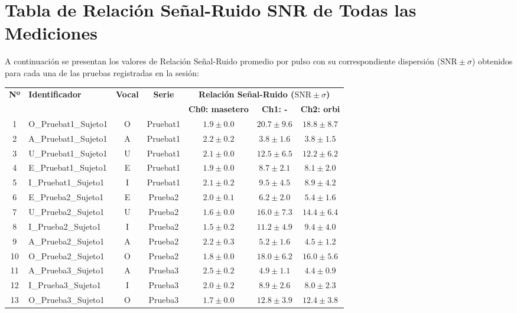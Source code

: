 \documentclass[11pt,a4paper]{article}
\begin{document}
\section{Tabla de Relación Señal-Ruido SNR de Todas las Mediciones}
A continuación se presentan los valores de Relación Señal-Ruido promedio por pulso con su correspondiente dispersión ($\text{SNR} \pm \sigma$) obtenidos para cada una de las pruebas registradas en la sesión:
\begin{table}[H]
\centering
\small
\setlength{\tabcolsep}{4.5pt}
\begin{tabular}{c l c c c c c}
\toprule
\textbf{Nº} & \textbf{Identificador} & \textbf{Vocal} & \textbf{Serie} & \multicolumn{3}{c}{\textbf{Relación Señal-Ruido ($\text{SNR} \pm \sigma$)}} \\
\cmidrule(lr){5-7}
& & & & \textbf{Ch0: masetero} & \textbf{Ch1: -} & \textbf{Ch2: orbi} \\
\midrule
1 & O\_Pruebat1\_Sujeto1 & O & Pruebat1 & $1.9 \pm 0.0$ & $20.7 \pm 9.6$ & $18.8 \pm 8.7$ \\
2 & A\_Pruebat1\_Sujeto1 & A & Pruebat1 & $2.2 \pm 0.2$ & $3.8 \pm 1.6$ & $3.8 \pm 1.5$ \\
3 & U\_Pruebat1\_Sujeto1 & U & Pruebat1 & $2.1 \pm 0.0$ & $12.5 \pm 6.5$ & $12.2 \pm 6.2$ \\
4 & E\_Pruebat1\_Sujeto1 & E & Pruebat1 & $1.9 \pm 0.0$ & $8.7 \pm 2.1$ & $8.1 \pm 2.0$ \\
5 & I\_Pruebat1\_Sujeto1 & I & Pruebat1 & $2.1 \pm 0.2$ & $9.5 \pm 4.5$ & $8.9 \pm 4.2$ \\
6 & E\_Prueba2\_Sujeto1 & E & Prueba2 & $2.0 \pm 0.1$ & $6.2 \pm 2.0$ & $5.4 \pm 1.6$ \\
7 & U\_Prueba2\_Sujeto1 & U & Prueba2 & $1.6 \pm 0.0$ & $16.0 \pm 7.3$ & $14.4 \pm 6.4$ \\
8 & I\_Prueba2\_Sujeto1 & I & Prueba2 & $1.5 \pm 0.2$ & $11.2 \pm 4.9$ & $9.4 \pm 4.0$ \\
9 & A\_Prueba2\_Sujeto1 & A & Prueba2 & $2.2 \pm 0.3$ & $5.2 \pm 1.6$ & $4.5 \pm 1.2$ \\
10 & O\_Prueba2\_Sujeto1 & O & Prueba2 & $1.8 \pm 0.0$ & $18.0 \pm 6.2$ & $16.0 \pm 5.6$ \\
11 & A\_Prueba3\_Sujeto1 & A & Prueba3 & $2.5 \pm 0.2$ & $4.9 \pm 1.1$ & $4.4 \pm 0.9$ \\
12 & I\_Prueba3\_Sujeto1 & I & Prueba3 & $2.0 \pm 0.2$ & $8.9 \pm 2.6$ & $8.0 \pm 2.3$ \\
13 & O\_Prueba3\_Sujeto1 & O & Prueba3 & $1.7 \pm 0.0$ & $12.8 \pm 3.9$ & $12.4 \pm 3.8$ \\

\end{tabular}
\end{table}
\end{document}
